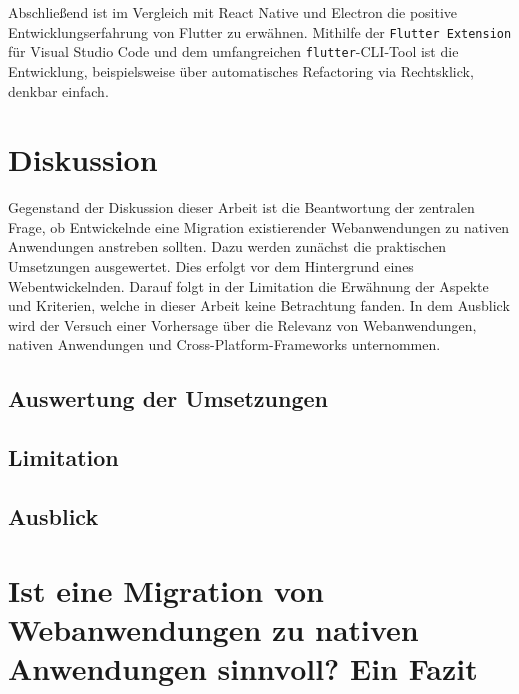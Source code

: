 \documentclass[a4paper]{scrartcl}
\begin{document}
Abschließend ist im Vergleich mit React Native und Electron die positive Entwicklungserfahrung von Flutter zu erwähnen. Mithilfe der \texttt{Flutter Extension} für Visual Studio Code und dem umfangreichen \texttt{flutter}-CLI-Tool ist die Entwicklung, beispielsweise über automatisches Refactoring via Rechtsklick, denkbar einfach.

\newpage

\section{Diskussion}

Gegenstand der Diskussion dieser Arbeit ist die Beantwortung der zentralen Frage, ob Entwickelnde eine Migration existierender Webanwendungen zu nativen Anwendungen anstreben sollten. Dazu werden zunächst die praktischen Umsetzungen ausgewertet. Dies erfolgt vor dem Hintergrund eines Webentwickelnden. Darauf folgt in der Limitation die Erwähnung der Aspekte und Kriterien, welche in dieser Arbeit keine Betrachtung fanden. In dem Ausblick wird der Versuch einer Vorhersage über die Relevanz von Webanwendungen, nativen Anwendungen und Cross-Platform-Frameworks unternommen.

\subsection{Auswertung der Umsetzungen}

\subsection{Limitation}

\subsection{Ausblick}

\section{Ist eine Migration von Webanwendungen zu nativen Anwendungen sinnvoll? Ein Fazit}


\newpage


\setcounter{page}{6}
\end{document}
